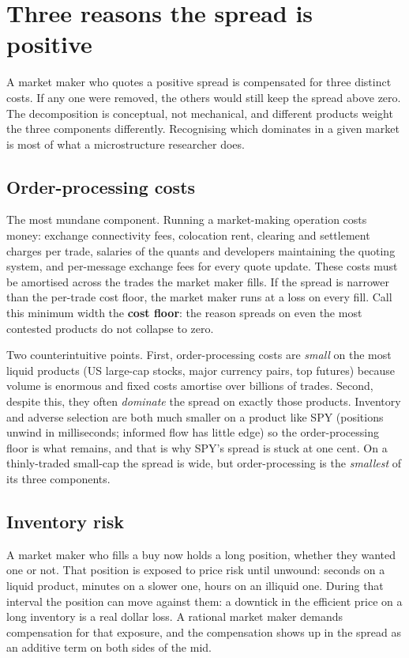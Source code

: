 \section{Three reasons the spread is positive}
\label{sec:three_causes}

A market maker who quotes a positive spread is compensated for
three distinct costs. If any one were removed, the others would
still keep the spread above zero. The decomposition is
conceptual, not mechanical, and different products weight the
three components differently. Recognising which dominates in a
given market is most of what a microstructure researcher does.

\subsection{Order-processing costs}
\label{subsec:order_processing}

The most mundane component. Running a market-making operation
costs money: exchange connectivity fees, colocation rent, clearing
and settlement charges per trade, salaries of the quants and
developers maintaining the quoting system, and per-message
exchange fees for every quote update. These costs must be
amortised across the trades the market maker fills. If the spread
is narrower than the per-trade cost floor, the market maker runs
at a loss on every fill. Call this minimum width the \textbf{cost
floor}: the reason spreads on even the most contested products do
not collapse to zero.

Two counterintuitive points. First, order-processing costs are
\emph{small} on the most liquid products (US large-cap stocks,
major currency pairs, top futures) because volume is enormous
and fixed costs amortise over billions of trades. Second, despite
this, they often \emph{dominate} the spread on exactly those
products. Inventory and adverse selection are both much smaller on
a product like SPY (positions unwind in milliseconds; informed
flow has little edge) so the order-processing floor is what
remains, and that is why SPY's spread is stuck at one cent. On a
thinly-traded small-cap the spread is wide, but order-processing
is the \emph{smallest} of its three components.

\subsection{Inventory risk}
\label{subsec:inventory_risk}

A market maker who fills a buy now holds a long position, whether
they wanted one or not. That position is exposed to price risk
until unwound: seconds on a liquid product, minutes on a slower
one, hours on an illiquid one. During that interval the position
can move against them: a downtick in the efficient price on a long
inventory is a real dollar loss. A rational market maker demands
compensation for that exposure, and the compensation shows up in
the spread as an additive term on both sides of the mid.

